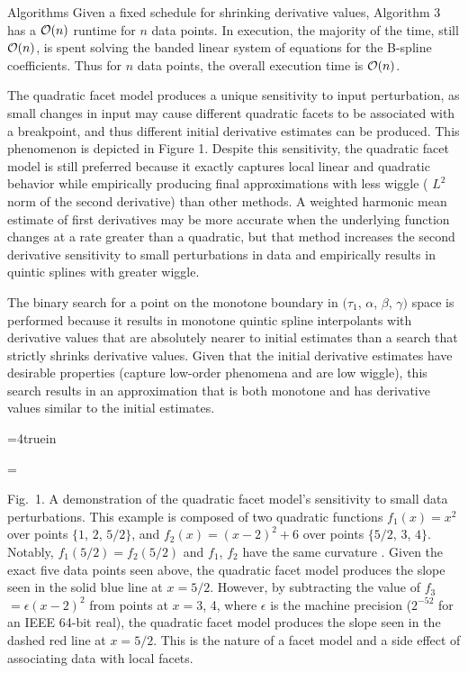 
Algorithms  Given a fixed
schedule for shrinking derivative values, Algorithm 3 has a ${\cal
  O}(n)$ runtime for $n$ data points. In execution, the majority of
the time, still ${\cal O}(n)$, is spent solving the banded linear
system of equations for the B-spline coefficients. Thus for $n$ data
points, the overall execution time is ${\cal O}(n)$.

The quadratic facet model produces a unique sensitivity to input
perturbation, as small changes in input may cause different quadratic
facets to be associated with a breakpoint, and thus different initial
derivative estimates can be produced. This phenomenon is depicted in
Figure 1. Despite this sensitivity, the quadratic facet model is still
preferred because it exactly captures local linear and quadratic
behavior while empirically producing final approximations with less
wiggle ( $L^2$ norm of the second derivative) than other methods. A
weighted harmonic mean estimate of first derivatives may be more
accurate when the underlying function changes at a rate greater than a
quadratic, but that method increases the second derivative sensitivity
to small perturbations in data and empirically results in quintic
splines with greater wiggle.

The binary search for a point on the monotone boundary in $(\tau_1$,
$\alpha$, $\beta$, $\gamma)$ space is performed because it results in
monotone quintic spline interpolants with derivative values that are
absolutely nearer to initial estimates than a search that strictly
shrinks derivative values. Given that the initial derivative estimates
have desirable properties (capture low-order phenomena and are low
wiggle), this search results in an approximation that is both monotone
and has derivative values similar to the initial estimates.


\topinsert
\centerline{\epsfxsize=4truein }
{\everymath={\scriptstyle}

\narrower\noindent\rmVIII Fig.\ 1. A demonstration of the quadratic
  facet model's sensitivity to small data perturbations. This example is
  composed of two quadratic functions $f_1(x) = x^2$ over points $\{1$,
  $2$, $5/2\}$, and $f_2(x) = (x-2)^2 + 6$ over points $\{5/2$, $3$,
  $4\}$. Notably, $f_1(5/2) = f_2(5/2)$ and $f_1$, $f_2$ have the same
  curvature . Given the exact five data points
  seen above, the quadratic facet model produces the slope seen in the
  solid blue line at $x = 5/2$. However, by subtracting the value of
  $f_3$ $= \epsilon(x-2)^2$ from points at $x = 3$, 4, where $\epsilon$
  is the machine precision ($2^{-52}$ for an IEEE 64-bit real), the
  quadratic facet model produces the slope seen in the dashed red line
  at $x = 5/2$. This is the nature of a facet model and a side effect
  of associating data with local facets.
\par} \endinsert
